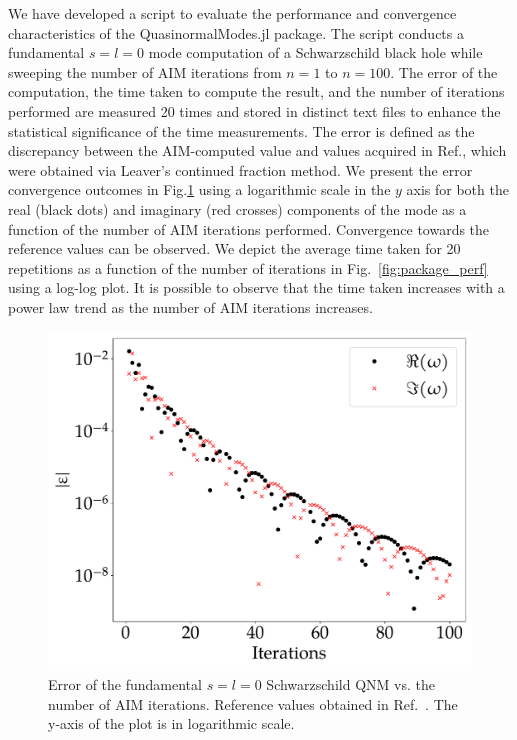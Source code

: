We have developed a script to evaluate the performance and convergence characteristics of the QuasinormalModes.jl package. The script conducts a fundamental $s=l=0$ mode computation of a Schwarzschild black hole while sweeping the number of AIM iterations from $n=1$ to $n=100$. The error of the computation, the time taken to compute the result, and the number of iterations performed are measured 20 times and stored in distinct text files to enhance the statistical significance of the time measurements. The error is defined as the discrepancy between the AIM-computed value and values acquired in Ref.\cite{BertiQNMData}, which were obtained via Leaver's continued fraction method. We present the error convergence outcomes in Fig.\ref{fig:package_error} using a logarithmic scale in the $y$ axis for both the real (black dots) and imaginary (red crosses) components of the mode as a function of the number of AIM iterations performed. Convergence towards the reference values can be observed. We depict the average time taken for 20 repetitions as a function of the number of iterations in Fig.~\ref{fig:package_perf} using a log-log plot. It is possible to observe that the time taken increases with a power law trend as the number of AIM iterations increases.

\begin{figure}[!ht]
  \centering
  \includegraphics[width=\linewidth]{img/aim_qnm/err.pdf}
  \caption{Error of the fundamental $s=l=0$ Schwarzschild QNM vs. the number of AIM iterations. Reference values obtained in Ref.~\cite{BertiQNMData}. The y-axis of the plot is in logarithmic scale.}
  \label{fig:package_error}
\end{figure}

